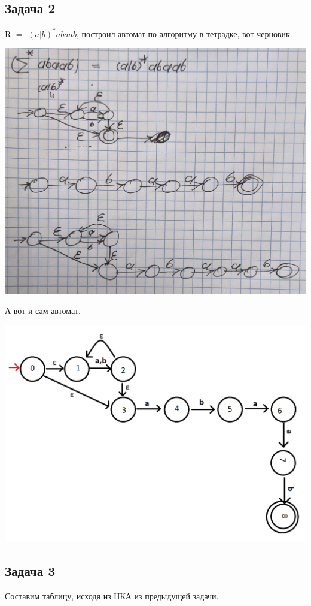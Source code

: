 \documentclass[a4paper,14pt]{article} %
\begin{document}
    
    \subsection{Задача 2}
    R $=$ $(a|b)^{*}abaab$, построил автомат по алгоритму в тетрадке, вот черновик.

    \includegraphics[scale=0.23]{04.jpg}
    
    А вот и сам автомат.

    \includegraphics[scale=0.65]{03.png}

    \newpage
    \subsection{Задача 3}
    Составим таблицу, исходя из НКА из предыдущей задачи.
\end{document}
